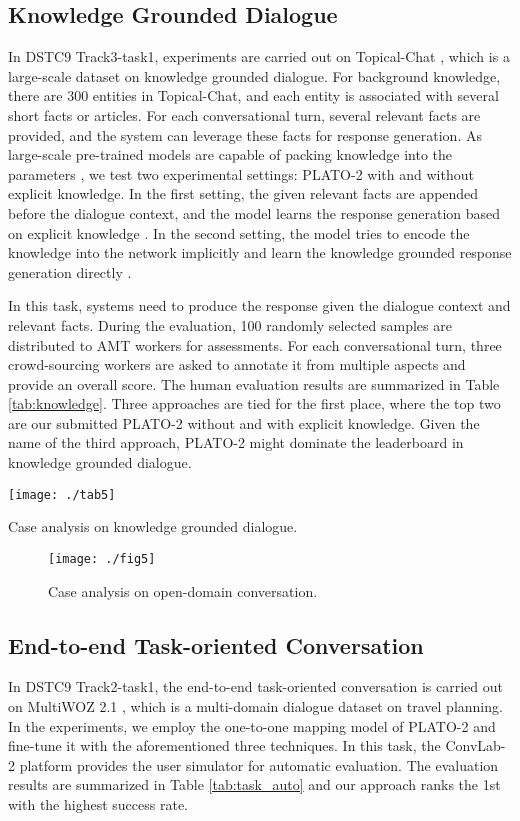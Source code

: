 \documentclass[letterpaper]{article} \usepackage{aaai21}  \usepackage{times}  \usepackage{helvet} \usepackage{courier}  \usepackage[hyphens]{url}  \usepackage{graphicx} \urlstyle{rm} \def\UrlFont{\rm}  \usepackage{natbib}  \usepackage{caption} \frenchspacing  \setlength{\pdfpagewidth}{8.5in}  \setlength{\pdfpageheight}{11in}  \usepackage{amsmath}
\begin{document}
\subsection{Knowledge Grounded Dialogue}
In DSTC9 Track3-task1, experiments are carried out on Topical-Chat \cite{gopalakrishnan2019topical}, which is a large-scale dataset on knowledge grounded dialogue. For background knowledge, there are 300 entities in Topical-Chat, and each entity is associated with several short facts or articles. For each conversational turn, several relevant facts are provided, and the system can leverage these facts for response generation. As large-scale pre-trained models are capable of packing knowledge into the parameters \cite{roberts2020much}, we test two experimental settings: PLATO-2 with and without explicit knowledge. In the first setting, the given relevant facts are appended before the dialogue context, and the model learns the response generation based on explicit knowledge . In the second setting, the model tries to encode the knowledge into the network implicitly and learn the knowledge grounded response generation directly . 

In this task, systems need to produce the response given the dialogue context and relevant facts. During the evaluation, 100 randomly selected samples are distributed to AMT workers for assessments. For each conversational turn, three crowd-sourcing workers are asked to annotate it from multiple aspects and provide an overall score. The human evaluation results are summarized in Table \ref{tab:knowledge}. Three approaches are tied for the first place, where the top two are our submitted PLATO-2 without and with explicit knowledge. Given the name of the third approach, PLATO-2 might dominate the leaderboard in knowledge grounded dialogue.  
\begin{table*}
	\centering
	\texttt{[image: ./tab5]}
	\caption{Case analysis on knowledge grounded dialogue.}
	\label{tab:case_knowledge}
\end{table*} 
\begin{figure}
	\centering
	\texttt{[image: ./fig5]}
	\caption{Case analysis on open-domain conversation.}
	\label{fig:case_chat}
\end{figure} 

\subsection{End-to-end Task-oriented Conversation}
In DSTC9 Track2-task1, the end-to-end task-oriented conversation is carried out on MultiWOZ 2.1 \cite{eric2020multiwoz}, which is a multi-domain dialogue dataset on travel planning. In the experiments, we employ the one-to-one mapping model of PLATO-2 and fine-tune it with the aforementioned three techniques. In this task, the ConvLab-2 platform \cite{zhu2020convlab} provides the user simulator for automatic evaluation. The evaluation results are summarized in Table \ref{tab:task_auto} and our approach ranks the 1st with the highest success rate. 
\end{document}
